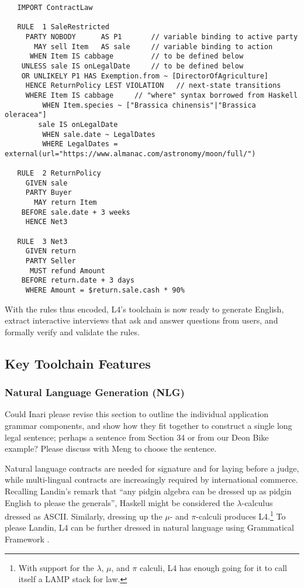 \documentclass{IOS-Book-Article}
\begin{document}
\begin{lstlisting}
   IMPORT ContractLaw

   RULE  1 SaleRestricted
     PARTY NOBODY      AS P1       // variable binding to active party
       MAY sell Item   AS sale     // variable binding to action
      WHEN Item IS cabbage         // to be defined below
    UNLESS sale IS onLegalDate     // to be defined below
	OR UNLIKELY P1 HAS Exemption.from ~ [DirectorOfAgriculture]
     HENCE ReturnPolicy LEST VIOLATION   // next-state transitions
     WHERE Item IS cabbage     // "where" syntax borrowed from Haskell
	     WHEN Item.species ~ ["Brassica chinensis"|"Brassica oleracea"]
	    sale IS onLegalDate
	     WHEN sale.date ~ LegalDates
	     WHERE LegalDates = external(url="https://www.almanac.com/astronomy/moon/full/")

   RULE  2 ReturnPolicy
     GIVEN sale
     PARTY Buyer
       MAY return Item
    BEFORE sale.date + 3 weeks
     HENCE Net3

   RULE  3 Net3
     GIVEN return
     PARTY Seller
      MUST refund Amount
    BEFORE return.date + 3 days
     WHERE Amount = $return.sale.cash * 90%
\end{lstlisting}

\noindent With the rules thus encoded, L4's toolchain is now ready to generate English, extract interactive interviews that ask and answer questions from users, and formally verify and validate the rules.

\subsection{Key Toolchain Features}

\subsubsection{Natural Language Generation (NLG)}

Could Inari please revise this section to outline the individual application grammar components, and show how they fit together to construct a single long legal sentence; perhaps a sentence from Section 34 or from our Deon Bike example? Please discuss with Meng to choose the sentence.

Natural language contracts are needed for signature and for laying before a judge, while multi-lingual contracts are increasingly required by international commerce. Recalling Landin's \cite{landin_next_1966} remark that ``any pidgin algebra can be dressed up as pidgin English to please the generals'', Haskell might be considered the $\lambda$-calculus dressed as ASCII. Similarly, dressing up the $\mu$- and $\pi$-calculi produces L4.\footnote{With support for the $\lambda$, $\mu$, and $\pi$ calculi, L4 has enough going for it to call itself a LAMP stack for law.} To please Landin, L4 can be further dressed in natural language using Grammatical Framework \cite{ranta_grammatical_2004}.
\end{document}
